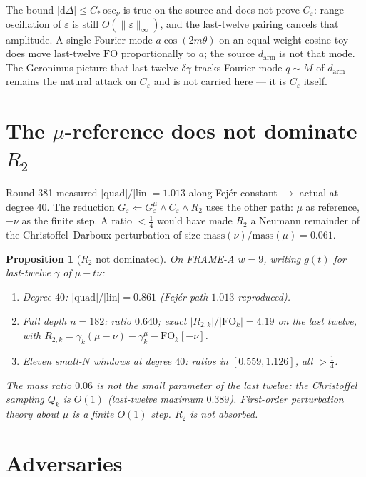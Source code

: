\documentclass[11pt]{article}
\newtheorem{prop}{Proposition}
\theoremstyle{remark}
\begin{document}
The bound $\lvert\mathrm{d}\Delta\rvert\le C_*\,\mathrm{osc}_\nu$ is true
on the source and does not prove $C_\varepsilon$: range-oscillation of
$\varepsilon$ is still $O(\lVert\varepsilon\rVert_\infty)$, and the
last-twelve pairing cancels that amplitude.
A single Fourier mode $a\cos(2m\theta)$ on an equal-weight cosine toy
does move last-twelve $\mathrm{FO}$ proportionally to $a$; the source
$d_{\mathrm{arm}}$ is not that mode.
The Geronimus picture that last-twelve $\delta\gamma$ tracks Fourier
mode $q\sim M$ of $d_{\mathrm{arm}}$ remains the natural attack on
$C_\varepsilon$ and is not carried here --- it is $C_\varepsilon$ itself.

\section{The $\mu$-reference does not dominate $R_2$}\label{sec:r2}

Round 381 measured $\lvert\mathrm{quad}\rvert/\lvert\mathrm{lin}\rvert=1.013$
along Fej\'er-constant $\to$ actual at degree $40$.
The reduction $G_\varepsilon\Longleftarrow G_\varepsilon^\mu\wedge C_\varepsilon\wedge R_2$
uses the other path: $\mu$ as reference, $-\nu$ as the finite step.
A ratio $<\tfrac14$ would have made $R_2$ a Neumann remainder of the
Christoffel--Darboux perturbation of size $\mathrm{mass}(\nu)/\mathrm{mass}(\mu)=0.061$.

\begin{prop}[$R_2$ not dominated]\label{prop:r2}
On FRAME-A $w=9$, writing $g(t)$ for last-twelve $\gamma$ of $\mu-t\nu$:
\begin{enumerate}
\item Degree $40$: $\lvert\mathrm{quad}\rvert/\lvert\mathrm{lin}\rvert=0.861$
  (Fej\'er-path $1.013$ reproduced).
\item Full depth $n=182$: ratio $0.640$;
  exact $\lvert R_{2,k}\rvert/\lvert\mathrm{FO}_k\rvert=4.19$ on the last
  twelve, with
  $R_{2,k}=\gamma_k(\mu-\nu)-\gamma_k^\mu-\mathrm{FO}_k[-\nu]$.
\item Eleven small-$N$ windows at degree $40$: ratios in $[0.559,1.126]$,
  all $>\tfrac14$.
\end{enumerate}
The mass ratio $0.06$ is not the small parameter of the last twelve:
the Christoffel sampling $Q_k$ is $O(1)$ (last-twelve maximum $0.389$).
First-order perturbation theory about $\mu$ is a finite $O(1)$ step.
$R_2$ is not absorbed.
\end{prop}

\section{Adversaries}\label{sec:adv}
\end{document}
